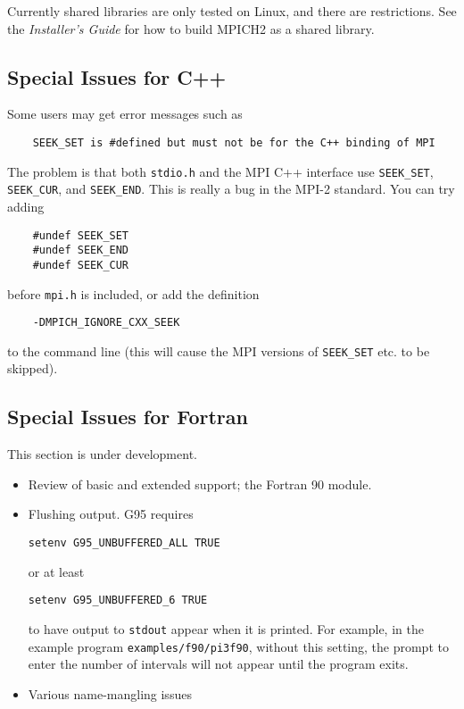 \documentclass[dvipdfm,11pt]{article}
\begin{document}
Currently shared libraries are only tested on Linux, and there are
restrictions.  See the \emph{Installer's Guide} for how to build MPICH2
as a shared library.

\subsection{Special Issues for C++}
\label{sec:cxx}

Some users may get error messages such as
\begin{verbatim}
    SEEK_SET is #defined but must not be for the C++ binding of MPI
\end{verbatim}
The problem is that both \texttt{stdio.h} and the MPI C++ interface use
\texttt{SEEK\_SET}, \texttt{SEEK\_CUR}, and \texttt{SEEK\_END}.  This is really a bug
in the MPI-2 standard.  You can try adding 
\begin{verbatim}
    #undef SEEK_SET
    #undef SEEK_END
    #undef SEEK_CUR
\end{verbatim}
before \texttt{mpi.h} is included, or add the definition
\begin{verbatim}
    -DMPICH_IGNORE_CXX_SEEK
\end{verbatim}
to the command line (this will cause the MPI versions of \texttt{SEEK\_SET}
etc. to be skipped).

\subsection{Special Issues for Fortran}
\label{sec:fortran}
This section is under development.

\begin{itemize}
\item Review of basic and extended support; the Fortran 90 module.
\item Flushing output.
G95 requires 
\begin{verbatim}
setenv G95_UNBUFFERED_ALL TRUE
\end{verbatim}
or at least
\begin{verbatim}
setenv G95_UNBUFFERED_6 TRUE
\end{verbatim}
to have output to \texttt{stdout} appear when it is printed.  For
example, in the example program \texttt{examples/f90/pi3f90}, without
this setting, the prompt to enter the number of intervals will not
appear until the program exits.

\item Various name-mangling issues
\end{itemize}
\end{document}
